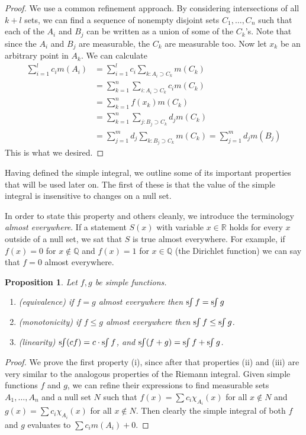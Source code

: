 \documentclass[11pt,oneside]{amsbook}
\newcommand{\QQ}{{\mathbb Q}}
\newcommand{\RR}{{\mathbb R}}
\newcommand{\sint}{\text{s}\kern-3pt\int}
\theoremstyle{definition}
\theoremstyle{plain}
\newtheorem{prop}[thm]{Proposition}
\theoremstyle{definition}
\theoremstyle{remark}
\numberwithin{equation}{section}
\numberwithin{figure}{section}
\begin{document}
\begin{proof}
  We use a common refinement approach. By considering intersections of all $k+l$ sets, we can find a sequence of nonempty disjoint sets $C_1,\ldots,C_n$ such that each of the $A_i$ and $B_j$ can be written as a union of some of the $C_k$'s. Note that since the $A_i$ and $B_j$ are measurable, the $C_k$ are measurable too. Now let $x_k$ be an arbitrary point in $A_k$. We can calculate
  \begin{align*}
    \sum_{i=1}^lc_im(A_i)
    &=\sum_{i=1}^lc_i\sum_{k:A_i\supset C_k}m(C_k)\\
    &=\sum_{k=1}^n\sum_{i:A_i\supset C_k}c_im(C_k)\\
    &=\sum_{k=1}^nf(x_k)m(C_k)\\
    &=\sum_{k=1}^n\sum_{j:B_j\supset C_k}d_jm(C_k)\\
    &=\sum_{j=1}^md_j\sum_{k:B_j\supset C_k}m(C_k)=\sum_{j=1}^md_jm(B_j)
  \end{align*}
  This is what we desired.
\end{proof}

Having defined the simple integral, we outline some of its important properties that will be used later on. The first of these is that the value of the simple integral is insensitive to changes on a null set.

In order to state this property and others cleanly, we introduce the terminology \emph{almost everywhere}. If a statement $S(x)$ with variable $x\in\RR$ holds for every $x$ outside of a null set, we sat that $S$ is true almost everywhere. For example, if $f(x)=0$ for $x\notin\QQ$ and $f(x)=1$ for $x\in\QQ$ (the Dirichlet function) we can say that $f=0$ almost everywhere.

\begin{prop}
  Let $f,g$ be simple functions.
  \begin{enumerate}
  \item (equivalence) if $f=g$ almost everywhere then $\sint f=\sint g$
  \item (monotonicity) if $f\leq g$ almost everywhere then $\sint f\leq\sint g$.
  \item (linearity) $\sint (cf)=c\cdot\sint f$, and $\sint (f+g)=\sint f+\sint g$.
  \end{enumerate}
\end{prop}

\begin{proof}
  We prove the first property (i), since after that properties (ii) and (iii) are very similar to the analogous properties of the Riemann integral. Given simple functions $f$ and $g$, we can refine their expressions to find measurable sets $A_1,\ldots,A_n$ and a null set $N$ such that $f(x)=\sum c_i\chi_{A_i}(x)$ for all $x\notin N$ and $g(x)=\sum c_i\chi_{A_i}(x)$ for all $x\notin N$. Then clearly the simple integral of both $f$ and $g$ evaluates to $\sum c_im(A_i)+0$.
\end{proof}
\end{document}
